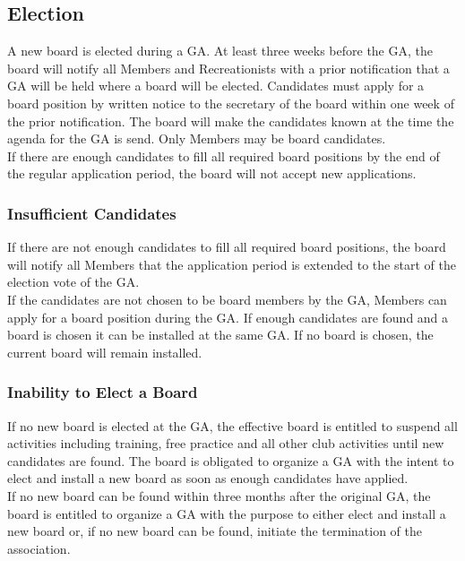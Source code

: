 \documentclass[a4paper]{article}
\begin{document}
\subsection{Election}
A new board is elected during a GA. At least three weeks before the GA, the board will notify all Members and Recreationists with a prior notification that a GA will be held where a board will be elected. Candidates must apply for a board position by written notice to the secretary of the board within one week of the prior notification. The board will make the candidates known at the time the agenda for the GA is send. Only Members may be board candidates. \\

If there are enough candidates to fill all required board positions by the end of the regular application period, the board will not accept new applications. \\

\subsubsection{Insufficient Candidates}

If there are not enough candidates to fill all required board positions, the board will notify all Members that the application period is extended to the start of the election vote of the GA. \\

If the candidates are not chosen to be board members by the GA, Members can apply for a board position during the GA. If enough candidates are found and a board is chosen it can be installed at the same GA. If no board is chosen, the current board will remain installed.

\subsubsection{Inability to Elect a Board}

If no new board is elected at the GA, the effective board is entitled to suspend all activities including training, free practice and all other club activities until new candidates are found. The board is obligated to organize a GA with the intent to elect and install a new board as soon as enough candidates have applied. \\

If no new board can be found within three months after the original GA, the board is entitled to organize a GA with the purpose to either elect and install a new board or, if no new board can be found, initiate the termination of the association.
\end{document}
